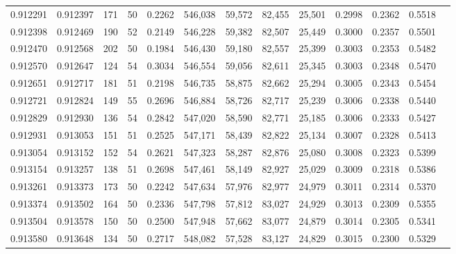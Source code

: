 \begin{tabular}{rrrrrrrrrrrrr}
0.912291 & 0.912397 &   171 &  50 &                                     0.2262 & 546,038 &  59,572 &  82,455 &  25,501 & 0.2998 & 0.2362 & 0.5518 \\
0.912398 & 0.912469 &   190 &  52 &                                     0.2149 & 546,228 &  59,382 &  82,507 &  25,449 & 0.3000 & 0.2357 & 0.5501 \\
0.912470 & 0.912568 &   202 &  50 &                                     0.1984 & 546,430 &  59,180 &  82,557 &  25,399 & 0.3003 & 0.2353 & 0.5482 \\
0.912570 & 0.912647 &   124 &  54 &                                     0.3034 & 546,554 &  59,056 &  82,611 &  25,345 & 0.3003 & 0.2348 & 0.5470 \\
0.912651 & 0.912717 &   181 &  51 &                                     0.2198 & 546,735 &  58,875 &  82,662 &  25,294 & 0.3005 & 0.2343 & 0.5454 \\
0.912721 & 0.912824 &   149 &  55 &                                     0.2696 & 546,884 &  58,726 &  82,717 &  25,239 & 0.3006 & 0.2338 & 0.5440 \\
0.912829 & 0.912930 &   136 &  54 &                                     0.2842 & 547,020 &  58,590 &  82,771 &  25,185 & 0.3006 & 0.2333 & 0.5427 \\
0.912931 & 0.913053 &   151 &  51 &                                     0.2525 & 547,171 &  58,439 &  82,822 &  25,134 & 0.3007 & 0.2328 & 0.5413 \\
0.913054 & 0.913152 &   152 &  54 &                                     0.2621 & 547,323 &  58,287 &  82,876 &  25,080 & 0.3008 & 0.2323 & 0.5399 \\
0.913154 & 0.913257 &   138 &  51 &                                     0.2698 & 547,461 &  58,149 &  82,927 &  25,029 & 0.3009 & 0.2318 & 0.5386 \\
0.913261 & 0.913373 &   173 &  50 &                                     0.2242 & 547,634 &  57,976 &  82,977 &  24,979 & 0.3011 & 0.2314 & 0.5370 \\
0.913374 & 0.913502 &   164 &  50 &                                     0.2336 & 547,798 &  57,812 &  83,027 &  24,929 & 0.3013 & 0.2309 & 0.5355 \\
0.913504 & 0.913578 &   150 &  50 &                                     0.2500 & 547,948 &  57,662 &  83,077 &  24,879 & 0.3014 & 0.2305 & 0.5341 \\
0.913580 & 0.913648 &   134 &  50 &                                     0.2717 & 548,082 &  57,528 &  83,127 &  24,829 & 0.3015 & 0.2300 & 0.5329 \\

\end{tabular}
